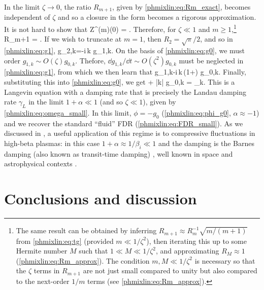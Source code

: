 In the limit $\zeta\to0$, the ratio $R_{m+1}$, given by \eqref{phmixlin:eq:Rm_exact}, becomes 
independent of $\zeta$ and so a closure in the form  
becomes a rigorous approximation. It is not hard to show that 
\beq
Z^{(m)}(0) = .
\eeq
Therefore, for $\zeta\ll1$ and $m\ge1$,\footnote{The same result can be obtained 
by inferring $R_{m+1} \approx R_m^{-1}\sqrt{m/(m+1)}$ from \eqref{phmixlin:eq:tg} 
(provided $m\ll1/\zeta^2$), then iterating this up to some Hermite number $M$
such that $1\ll M\ll1/\zeta^2$, and approximating $R_M\approx1$ (\eqref{phmixlin:eq:Rm_approx}).
The condition $m, M \ll 1/\zeta^2$ is necessary so that the $\zeta$ terms in 
$R_{m+1}$ are not just small compared to unity but also compared to the next-order 
$1/m$ terms (see \eqref{phmixlin:eq:Rm_approx}).} 
\beq
R_{m+1} = . 
\eeq
If we wish to truncate at $m=1$, then $R_2=\sqrt{\pi}/2$, and so in \eqref{phmixlin:eq:g1}, 
\beq
g_{2,k}=-i\,\sgn k\,\,g_{1,k}.
\eeq
On the basis of \eqref{phmixlin:eq:g0}, we must order $g_{1,k}\sim O(\zeta) g_{0,k}$. 
Thefore, $\dd g_{1,k}/\dd t \sim O(\zeta^2) g_{0,k}$ must be neglected 
in \eqref{phmixlin:eq:g1}, from which we then learn that 
\beq
g_{1,k}\approx -i\,\sgn k\,\lt(1+\alpha\rt) g_{0,k}.
\eeq
Finally, substituting this into \eqref{phmixlin:eq:g0}, we get
\beq
{} + |k| g_{0,k} = \chi_k.
\label{phmixlin:eq:LF_Langevin}
\eeq
This is a Langevin equation  with a damping rate that 
is precisely the Landau damping rate $\gamma_L$ in the limit $1+\alpha\ll1$ 
(and so $\zeta\ll1$), given by \eqref{phmixlin:eq:omega_small}. 
In this limit, $\phi = -g_0$ (\eqref{phmixlin:eq:phi_g0}, $\alpha\approx-1$) 
and we recover the standard ``fluid'' FDR (\eqref{phmixlin:eq:FDR_small}). 
As we discussed in , a useful application of this regime 
is to compressive fluctuations in high-beta plasmas: in this case 
$1+\alpha\approx 1/\beta_i\ll1$ and the damping is the Barnes damping (also known as
transit-time damping) \cite{barnes66}, well known in space and astrophysical contexts \cite{foote79,lithwick01,tome}. 


\section{Conclusions and discussion}
\label{phmixlin:sec:disc}

